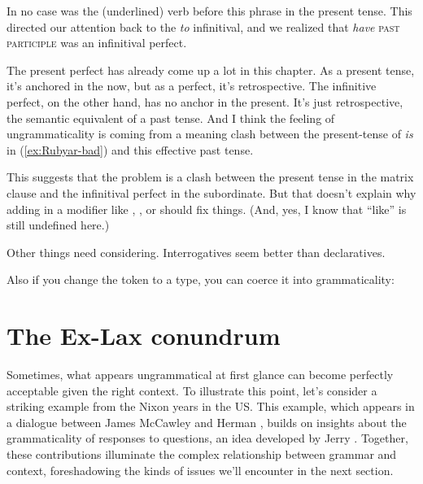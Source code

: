 In no case was the (underlined) verb before this phrase in the present tense. This directed our attention back to the \textit{to} infinitival, and we realized that \textit{have} \textsc{past participle} was an infinitival perfect.

The present perfect has already come up a lot in this chapter. As a present tense, it's anchored in the now, but as a perfect, it's retrospective. The infinitive perfect, on the other hand, has no anchor in the present. It's just retrospective, the semantic equivalent of a past tense. And I think the feeling of ungrammaticality is coming from a meaning clash between the present-tense of \textit{is} in (\ref{ex:Rubyar-bad}) and this effective past tense.

This suggests that the problem is a clash between the present tense in the matrix clause and the infinitival perfect in the subordinate. But that doesn't explain why adding in a modifier like , , or  should fix things. (And, yes, I know that \enquote{like} is still undefined here.)

Other things need considering. Interrogatives seem better than declaratives.

\ea
    \z
\z

Also if you change the token to a type, you can coerce it into grammaticality:

\ea
    \z
\z

\section{The Ex-Lax conundrum}

Sometimes, what appears ungrammatical at first glance can become perfectly acceptable given the right context. To illustrate this point, let's consider a striking example from the Nixon years in the US. This example, which appears in a dialogue between James McCawley and Herman  \citet[252]{Parret1974}, builds on insights about the grammaticality of responses to questions, an idea developed by Jerry \citet{Morgan1973}. Together, these contributions illuminate the complex relationship between grammar and context, foreshadowing the kinds of issues we'll encounter in the next section.

